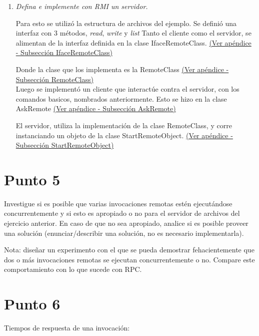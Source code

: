 \documentclass[12pt,journal,compsoc]{IEEEtran}
\begin{document}
\begin{enumerate}[label=\alph* -]
  \item \textit{Defina e implemente con RMI un servidor.}
  
  Para esto se utilizó la estructura de archivos del ejemplo. Se definió
  una interfaz con 3 métodos, \textit{read}, \textit{write} y
  \textit{list}
  Tanto el cliente como el servidor, se alimentan de la interfaz definida
  en la clase IfaceRemoteClass.
  \hyperref[section:IfaceRemoteClass]{(Ver apéndice - Subsección IfaceRemoteClass)}
  
  Donde la clase que los implementa es la RemoteClass
  \hyperref[section:RemoteClass]{(Ver apéndice - Subsección RemoteClass)}\\
  
  Luego se implementó un cliente que interactúe contra el servidor, con
  los comandos basicos, nombrados anteriormente. Esto se hizo en la clase
  AskRemote
  \hyperref[section:AskRemote]{(Ver apéndice - Subsección AskRemote)}

  El servidor, utiliza la implementación de la clase RemoteClass, y
  corre instanciando un objeto de la clase StartRemoteObject.
  \hyperref[section:StartRemoteObject]{(Ver apéndice - Subsección StartRemoteObject)}

\end{enumerate}

\section{Punto 5}

Investigue si es posible que varias invocaciones remotas estén
ejecutándose concurrentemente y si esto es apropiado o no para el
servidor de archivos del ejercicio anterior. En caso de que no sea 
apropiado, analice si es posible proveer una solución
(enunciar/describir una solución, no es necesario implementarla).

Nota: diseñar un experimento con el que se pueda demostrar
fehacientemente que dos o más invocaciones remotas se ejecutan
concurrentemente o no. Compare este comportamiento con lo que sucede con
RPC.

\section{Punto 6}

Tiempos de respuesta de una invocación:
\end{document}
